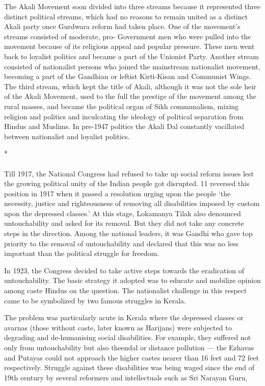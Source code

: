 The Akali Movement soon divided into three streams because it represented three distinct political streams, which had no reasons to remain united as a distinct Akali party once Gurdwara reform had taken place. One of the movement's streams consisted of moderate, pro- Government men who were pulled into the movement because of its religious appeal and popular pressure. These men went back to loyalist politics and became a part of the Unionist Party. Another stream consisted of nationalist persons who joined the mainstream nationalist movement, becoming a part of the Gandhian or leftist Kirti-Kisan and Communist Wings. The third stream, which kept the title of Akali, although it was not the sole heir of the Akali Movement, used to the full the prestige of the movement among the rural masses, and became the political organ of Sikh communalism, mixing religion and politics and inculcating the ideology of political separation from Hindus and Muslims. In pre-1947 politics the Akali Dal constantly vacillated between nationalist and loyalist politics.

\begin{center}*\end{center}

\paragraph*{}

Till 1917, the National Congress had refused to take up social reform issues lest the growing political unity of the Indian people got disrupted. 11 reversed this position in 1917 when it passed a resolution urging upon the people `the necessity, justice and righteousness of removing all disabilities imposed by custom upon the depressed classes.' At this stage, Lokamanya Tilak also denounced untouchability and asked for its removal. But they did not take any concrete steps in the direction. Among the national leaders, it was Gandhi who gave top priority to the removal of untouchability and declared that this was no less important than the political struggle for freedom.

In 1923, the Congress decided to take active steps towards the eradication of untouchability. The basic strategy it adopted was to educate and mobilize opinion among caste Hindus on the question. The nationalist challenge in this respect came to be symbolized by two famous struggles in Kerala.

The problem was particularly acute in Kerala where the depressed classes or avarnas (those without caste, later known as Harijans) were subjected to degrading and de-humanising social disabilities. For example, they suffered not only from untouchability but also theendal or distance pollution --- the Ezhavas and Putayas could not approach the higher castes nearer than 16 feet and 72 feet respectively. Struggle against these disabilities was being waged since the end of 19th century by several reformers and intellectuals such as Sri Narayan Guru,

